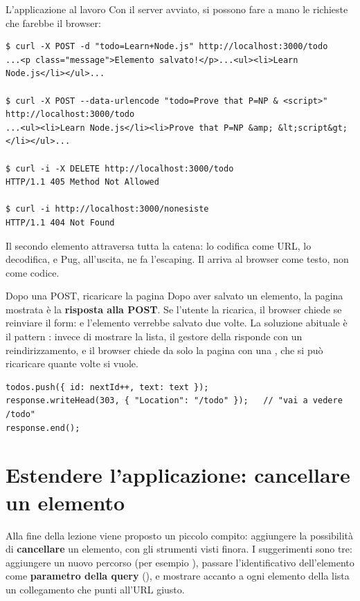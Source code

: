 \begin{esempio}{L'applicazione al lavoro}
Con il server avviato, si possono fare a mano le richieste che farebbe il
browser:
\begin{lstlisting}[style=shell, name=Terminale]
$ curl -X POST -d "todo=Learn+Node.js" http://localhost:3000/todo
...<p class="message">Elemento salvato!</p>...<ul><li>Learn Node.js</li></ul>...

$ curl -X POST --data-urlencode "todo=Prove that P=NP & <script>" http://localhost:3000/todo
...<ul><li>Learn Node.js</li><li>Prove that P=NP &amp; &lt;script&gt;</li></ul>...

$ curl -i -X DELETE http://localhost:3000/todo
HTTP/1.1 405 Method Not Allowed

$ curl -i http://localhost:3000/nonesiste
HTTP/1.1 404 Not Found
\end{lstlisting}
Il secondo elemento attraversa tutta la catena:  lo codifica come
URL,  lo decodifica, e Pug, all'uscita, ne fa
l'escaping. Il  arriva al browser come testo, non come codice.
\end{esempio}

\begin{infobox}{{Dopo una POST, ricaricare la pagina}}
  Dopo aver salvato un elemento, la pagina mostrata è la \textbf{risposta alla
  POST}. Se l'utente la ricarica, il browser chiede se reinviare il form: e
  l'elemento verrebbe salvato due volte. La soluzione abituale è il pattern
  : invece di mostrare la lista, il gestore della
   risponde con un reindirizzamento, e il browser chiede da solo la
  pagina con una , che si può ricaricare quante volte si vuole.
\begin{lstlisting}[style=js]
todos.push({ id: nextId++, text: text });
response.writeHead(303, { "Location": "/todo" });   // "vai a vedere /todo"
response.end();
\end{lstlisting}
\end{infobox}

\section{Estendere l'applicazione: cancellare un elemento}

Alla fine della lezione viene proposto un piccolo compito: aggiungere la
possibilità di \textbf{cancellare} un elemento, con gli strumenti visti finora.
I suggerimenti sono tre: aggiungere un nuovo percorso (per esempio
), passare l'identificativo dell'elemento come \textbf{parametro
della query} (), e mostrare accanto a ogni elemento della
lista un collegamento che punti all'URL giusto.

